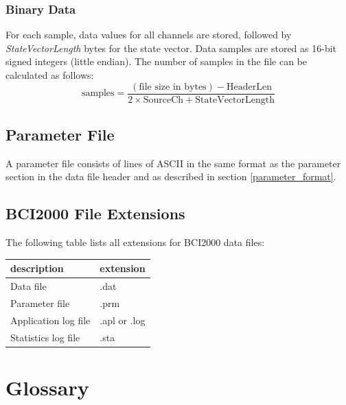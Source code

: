\documentclass[letterpaper,oneside,12pt]{book}
\begin{document}
\subsubsection{Binary Data}
\label{binary_data}

For each sample, data values for all channels are stored, followed by \textit{StateVectorLength} bytes for the state vector.
Data samples are stored as 16-bit signed integers (little 
endian).
The number of samples in the file can be calculated as follows: 
$$
  \textrm{samples}
    =\frac{(\textrm{file size in bytes})-\textrm{HeaderLen}}
    {2\times\textrm{SourceCh}+\textrm{StateVectorLength}}
$$

\subsection{Parameter File}

A parameter file consists of lines of ASCII in the same format as the parameter section in the data file header and as described in section \ref{parameter_format}.

\newpage
\subsection{BCI2000 File Extensions}

The following table lists all extensions for BCI2000 data files:
\vspace{0.5cm}\\
\begin{centering}
 \centering
 \begin{tabular}{|l|l|}
  \hline
  \textbf{description} & \textbf{extension} \\
  \hline
  Data file & .dat \\
  \hline
  Parameter file & .prm \\
  \hline
  Application log file & .apl or .log \\
  \hline
  Statistics log file & .sta \\
  \hline
 \end{tabular}
\end{centering}   

\section{Glossary} 
\end{document}
